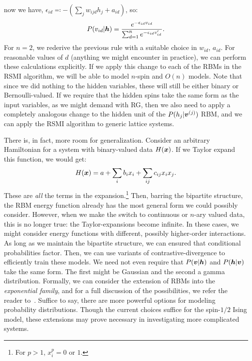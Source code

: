now we have, $\epsilon_{id}\eqcolon-(\sum_j w_{ijd}h_j+ a_{id})$, so:
\begin{equation}%
  P(v_{id}\rvert\bh)=\frac{e^{-\epsilon_{id} v_{id}}}{\sum_{d=1}^n e^{-\epsilon_{id} v_{id}'}}.
\end{equation}%
For $n=2$, we rederive the previous rule with a suitable choice in
$w_{id}$, $a_{id}$. For reasonable values of $d$ (anything we might
encounter in practice), we can perform these calculations
explicitly. If we apply this change to each of the RBMs in the RSMI
algorithm, we will be able to model $n$-spin and $O(n)$
models. Note that since we did nothing to the hidden variables, these
will still be either binary or Bernoulli-valued. If we require that
the hidden spins take the same form as the input variables, as we
might demand with RG, then we also need to apply a completely
analogous change to the hidden unit of the $P(h_j\rvert \boldsymbol{v}^{(j)})$
RBM, and we can apply the RSMI algorithm to generic lattice systems.

There is, in fact, more room for generalization. Consider an arbitrary
Hamiltonian for a system with binary-valued data $H(\boldsymbol{x})$. If we
Taylor expand this function, we would get:%
\begin{equation}%
  H(\bx)= a + \sum_i b_i x_i + \sum_{ij}c_{ij} x_i x_j.
\end{equation}%
These are \textit{all} the terms in the expansion.\footnote{For $p>1$,
  $x_i^p = 0$ or $1$.}  Then, barring the bipartite structure, the RBM
energy function already has the most general form we could possibly
consider.  However, when we make the switch to continuous or $n$-ary
valued data, this is no longer true: the Taylor-expansions become
infinite. In these cases, we might consider energy functions with
different, possibly higher-order interactions.  As long as we maintain
the bipartite structure, we can ensured that conditional probabilities
factor. Then, we can use variants of contrastive-divergence to
efficiently train these models. We need not even require that
$P(\boldsymbol{v}\rvert\boldsymbol{h})$ and $P(\boldsymbol{h}\rvert\boldsymbol{v})$ take the same form.  The first
might be Gaussian and the second a gamma distribution. Formally, we
can consider the extension of RBMs into the \textit{exponential
  family}, and for a full discussion of the possibilities, we refer
the reader to~\cite{welling}.  Suffice to say, there are more powerful
options for modeling probability distributions. Though the current
choices suffice for the spin-$1/2$ Ising model, these extensions may
prove necessary in investigating more complicated systems.

